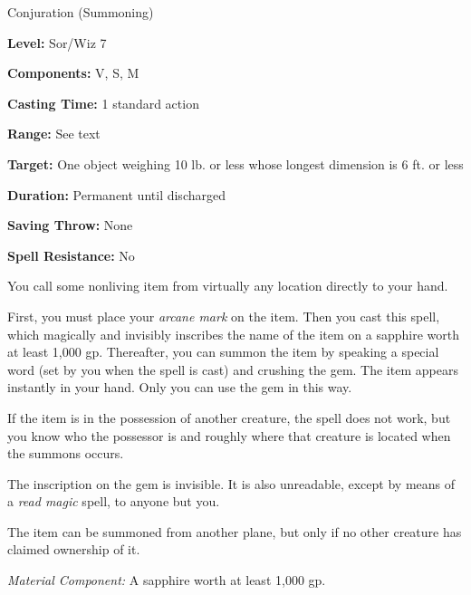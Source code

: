 
Conjuration (Summoning)

\textbf{Level:} Sor/Wiz 7

\textbf{Components:} V, S, M

\textbf{Casting Time:} 1 standard action

\textbf{Range:} See text

\textbf{Target:} One object weighing 10 lb. or less whose longest dimension is 
6 ft. or less

\textbf{Duration:} Permanent until discharged

\textbf{Saving Throw:} None

\textbf{Spell Resistance:} No

You call some nonliving item from virtually any location directly to your hand.

First, you must place your \textit{arcane mark} on the item. Then you cast this 
spell, which magically and invisibly inscribes the name of the item on a sapphire 
worth at least 1,000 gp. Thereafter, you can summon the item by speaking a special 
word (set by you when the spell is cast) and crushing the gem. The item appears 
instantly in your hand. Only you can use the gem in this way.

If the item is in the possession of another creature, the spell does not work, 
but you know who the possessor is and roughly where that creature is located when 
the summons occurs.

The inscription on the gem is invisible. It is also unreadable, except by means 
of a \textit{read magic} spell, to anyone but you.

The item can be summoned from another plane, but only if no other creature has 
claimed ownership of it.

\textit{Material Component:} A sapphire worth at least 1,000 gp.

